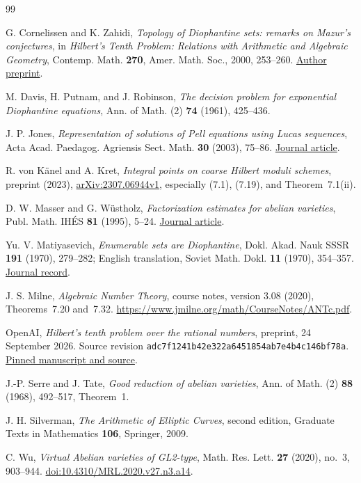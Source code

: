 \documentclass[11pt]{article}
\theoremstyle{definition}\newtheorem{inputthm}[theorem]{Hypothesis}
\theoremstyle{remark}\newtheorem{remark}[theorem]{Remark}
\begin{document}
\begin{thebibliography}{99}\small\raggedright
{}
G. Cornelissen and K. Zahidi, \emph{Topology of Diophantine sets:
remarks on Mazur's conjectures}, in \emph{Hilbert's Tenth Problem:
Relations with Arithmetic and Algebraic Geometry}, Contemp. Math.
\textbf{270}, Amer. Math. Soc., 2000, 253--260.
\href{https://arxiv.org/abs/math/0006140}{Author preprint}.

M. Davis, H. Putnam, and J. Robinson, \emph{The decision problem for
exponential Diophantine equations}, Ann. of Math. (2) \textbf{74}
(1961), 425--436.

J. P. Jones, \emph{Representation of solutions of Pell equations using
Lucas sequences}, Acta Acad. Paedagog. Agriensis Sect. Math.
\textbf{30} (2003), 75--86.
\href{https://real.mtak.hu/142342/1/AAPASM_30_from75to86.pdf}{Journal article}.

R. von K\"anel and A. Kret, \emph{Integral points on coarse Hilbert
moduli schemes}, preprint (2023),
\href{https://arxiv.org/abs/2307.06944}{arXiv:2307.06944v1},
especially (7.1), (7.19), and Theorem~7.1(ii).

D. W. Masser and G. W\"ustholz, \emph{Factorization estimates for
abelian varieties}, Publ. Math. IH\'ES \textbf{81} (1995), 5--24.
\href{https://www.numdam.org/item/PMIHES_1995__81__5_0/}{Journal article}.

Yu. V. Matiyasevich, \emph{Enumerable sets are Diophantine},
Dokl. Akad. Nauk SSSR \textbf{191} (1970), 279--282;
English translation, Soviet Math. Dokl. \textbf{11} (1970), 354--357.
\href{https://www.mathnet.ru/eng/dan35274}{Journal record}.

J. S. Milne, \emph{Algebraic Number Theory}, course notes,
version 3.08 (2020), Theorems~7.20 and~7.32.
\url{https://www.jmilne.org/math/CourseNotes/ANTc.pdf}.

OpenAI, \emph{Hilbert's tenth problem over the rational numbers},
preprint, 24 September 2026. Source revision
\texttt{adc7f1241b42e322a6451854ab7e4b4c146bf78a}.
\href{https://github.com/openai/math/tree/adc7f1241b42e322a6451854ab7e4b4c146bf78a/preprints/Hilberts-tenth-problem-over-the-rational-numbers-September-24-2026}{Pinned manuscript and source}.

J.-P. Serre and J. Tate, \emph{Good reduction of abelian varieties},
Ann. of Math. (2) \textbf{88} (1968), 492--517, Theorem~1.

J. H. Silverman, \emph{The Arithmetic of Elliptic Curves}, second
edition, Graduate Texts in Mathematics \textbf{106}, Springer, 2009.

C. Wu, \emph{Virtual Abelian varieties of GL2-type}, Math. Res. Lett.
\textbf{27} (2020), no.~3, 903--944.
\href{https://doi.org/10.4310/MRL.2020.v27.n3.a14}{doi:10.4310/MRL.2020.v27.n3.a14}.
\end{thebibliography}
\end{document}
